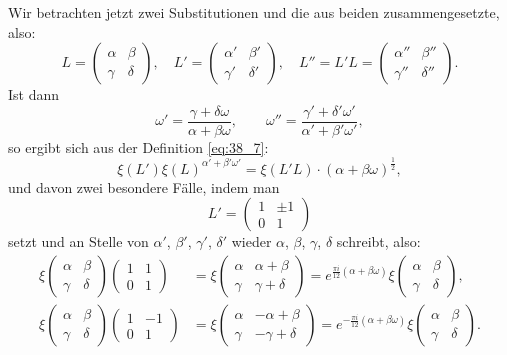 \documentclass[12pt,a4paper]{article}
\begin{document}
\newpage
\noindent
Wir betrachten jetzt zwei Substitutionen und die aus beiden zusammengesetzte, also:
\[
L = \begin{pmatrix} \alpha & \beta \\ \gamma & \delta \end{pmatrix},\quad
L' = \begin{pmatrix} \alpha' & \beta' \\ \gamma' & \delta' \end{pmatrix},\quad
L'' = L'L = \begin{pmatrix} \alpha'' & \beta'' \\ \gamma'' & \delta'' \end{pmatrix}.
\]
Ist dann
\[
\omega' = \frac{\gamma+\delta\omega}{\alpha+\beta\omega},\qquad
\omega'' = \frac{\gamma'+\delta'\omega'}{\alpha'+\beta'\omega'},
\]
so ergibt sich aus der Definition \eqref{eq:38_7}:
\begin{equation}\label{eq:38_12}
\xi(L')\xi(L)^{\alpha'+\beta'\omega'} = \xi(L'L)\cdot(\alpha+\beta\omega)^{\frac{1}{2}},
\end{equation}
und davon zwei besondere F\"alle, indem man
\[
L' = \begin{pmatrix} 1 & \pm 1 \\ 0 & 1 \end{pmatrix}
\]
setzt und an Stelle von $\alpha'$, $\beta'$, $\gamma'$, $\delta'$ wieder $\alpha$, $\beta$, $\gamma$, $\delta$ schreibt, also:
\begin{align}
\xi\begin{pmatrix}\alpha&\beta\\\gamma&\delta\end{pmatrix}\begin{pmatrix}1&1\\0&1\end{pmatrix}
&= \xi\begin{pmatrix}\alpha&\alpha+\beta\\\gamma&\gamma+\delta\end{pmatrix}
= e^{\frac{\pi i}{12}(\alpha+\beta\omega)}\xi\begin{pmatrix}\alpha&\beta\\\gamma&\delta\end{pmatrix}, \label{eq:38_13}\\
\xi\begin{pmatrix}\alpha&\beta\\\gamma&\delta\end{pmatrix}\begin{pmatrix}1&-1\\0&1\end{pmatrix}
&= \xi\begin{pmatrix}\alpha&-\alpha+\beta\\\gamma&-\gamma+\delta\end{pmatrix}
= e^{-\frac{\pi i}{12}(\alpha+\beta\omega)}\xi\begin{pmatrix}\alpha&\beta\\\gamma&\delta\end{pmatrix}. \label{eq:38_14}
\end{align}
\end{document}
